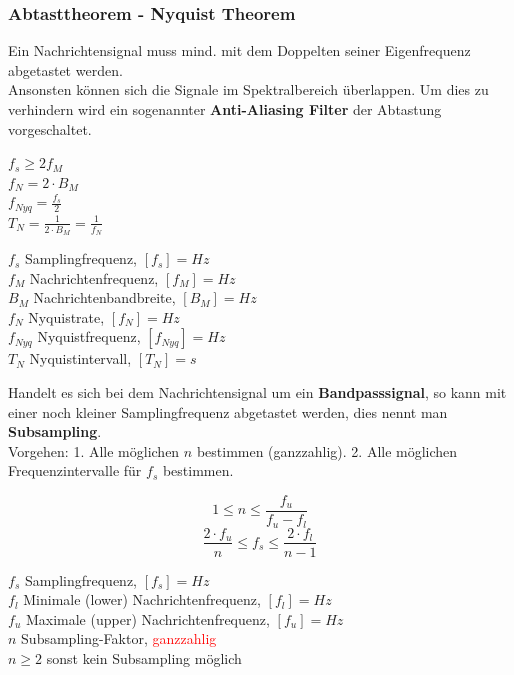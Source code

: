 \subsubsection{Abtasttheorem - Nyquist Theorem}
Ein Nachrichtensignal muss mind. mit dem Doppelten seiner Eigenfrequenz abgetastet werden. \\
Ansonsten können sich die Signale im Spektralbereich überlappen.  Um dies zu verhindern wird ein
sogenannter \textbf{Anti-Aliasing Filter} der Abtastung vorgeschaltet.\\
\begin{minipage}[t][2.7cm][c]{8cm}
$ f_s \geq 2 f_M $ \\
$ f_N = 2 \cdot B_M $ \\
$ f_{Nyq} = \frac{f_s}{2}$ \\
$ T_N = \frac{1}{2\cdot B_M} = \frac{1}{f_N} $

\end{minipage}
\begin{minipage}[t][2.7cm][c]{10cm}
	$f_s$ Samplingfrequenz, $[f_s] = Hz$ \\
	$f_M$ Nachrichtenfrequenz, $[f_M] = Hz$ \\
	$B_M$ Nachrichtenbandbreite, $[B_M] = Hz$ \\
	$f_N$ Nyquistrate, $[f_N] = Hz$ \\
	$f_{Nyq}$ Nyquistfrequenz, $[f_{Nyq}] = Hz$ \\
	$T_N$ Nyquistintervall, $[T_N] = s$ \\	
\end{minipage}

Handelt es sich bei dem Nachrichtensignal um ein \textbf{Bandpasssignal}, so kann mit einer noch
kleiner Samplingfrequenz abgetastet werden, dies nennt man \textbf{Subsampling}. \\
Vorgehen: 1. Alle möglichen $n$ bestimmen (ganzzahlig). 2. Alle möglichen Frequenzintervalle für
$f_s$ bestimmen.

\begin{minipage}[t][2cm][c]{10cm}
$$ 1 \leq n \leq \frac{f_u}{f_u - f_l} $$
$$ \frac{2 \cdot f_u}{n} \leq f_s \leq \frac{2 \cdot f_l}{n-1}$$
\end{minipage}
\begin{minipage}[t][2cm][c]{8cm}
	$f_s$ Samplingfrequenz, $[f_s] = Hz$ \\
	$f_l$ Minimale (lower) Nachrichtenfrequenz, $[f_l] = Hz$ \\
	$f_u$ Maximale (upper) Nachrichtenfrequenz, $[f_u] = Hz$ \\
	$n$ Subsampling-Faktor, \textcolor{red}{ganzzahlig} \\
	$n \geq 2$ sonst kein Subsampling möglich
\end{minipage}


